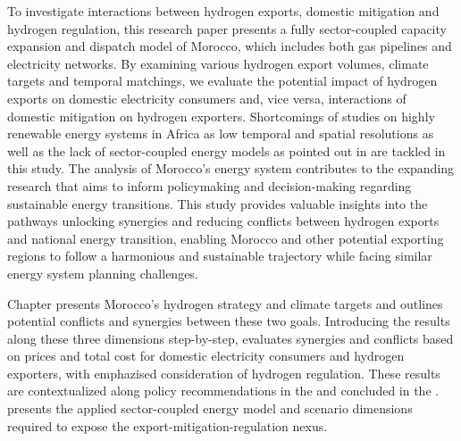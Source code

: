 To investigate interactions between hydrogen exports, domestic mitigation and hydrogen regulation, this research paper presents a fully sector-coupled capacity expansion and dispatch model of Morocco, which includes both gas pipelines and electricity networks. By examining various hydrogen export volumes, climate targets and temporal matchings, we evaluate the potential impact of hydrogen exports on domestic electricity consumers and, vice versa, interactions of domestic mitigation on hydrogen exporters.
Shortcomings of studies on highly renewable energy systems in Africa as low temporal and spatial resolutions as well as the lack of sector-coupled energy models as pointed out in \cite{Oyewo2023} are tackled in this study. The analysis of Morocco's energy system contributes to the expanding research that aims to inform policymaking and decision-making regarding sustainable energy transitions. This study provides valuable insights into the pathways unlocking synergies and reducing conflicts between hydrogen exports and national energy transition, enabling Morocco and other potential exporting regions to follow a harmonious and sustainable trajectory while facing similar energy system planning challenges.

Chapter  presents Morocco's hydrogen strategy and climate targets and outlines potential conflicts and synergies between these two goals. Introducing the results along these three dimensions step-by-step,  evaluates synergies and conflicts based on prices and total cost for domestic electricity consumers and hydrogen exporters, with emphazised consideration of hydrogen regulation. These results are contextualized along policy recommendations in the  and concluded in the .  presents the applied sector-coupled energy model and scenario dimensions required to expose the export-mitigation-regulation nexus.



%

